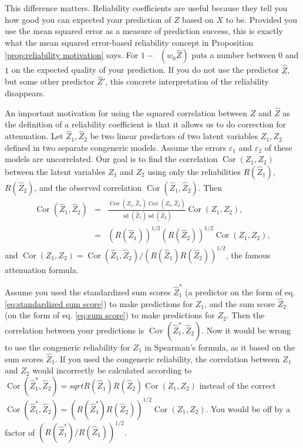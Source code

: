 \documentclass[twoside]{article}
\DeclareMathOperator{\sd}{sd}
\DeclareMathOperator{\Cor}{Cor}
\DeclareMathOperator{\Cov}{Cov}
\DeclareMathOperator{\MSE}{MSE_Z}
\renewcommand{\sqrt}[1]{{(#1)^{1/2}}}
\begin{document}
This difference matters. Reliability coefficients are useful because they tell you how good you can expected your prediction of $Z$ based on $X$ to be. Provided you use the mean squared error as a measure of prediction success, this is exactly what the mean squared error-based reliability concept in Proposition \ref{prop:reliability motivation} says. For $1 - \MSE(w_0\hat{Z})$ puts a number between $0$ and $1$ on the expected quality of your prediction. If you do not use the predictor $\hat{Z}$, but some other predictor $\hat{Z}'$, this concrete interpretation of the reliability disappears. 

An important motivation for using the squared
correlation between $Z$ and $\hat{Z}$ as the definition of a
reliability coefficient is that it allows us to do correction for
attenuation. Let $\hat{Z}_{1},\hat{Z}_{2}$ be two linear
predictors of two latent variables $Z_{1},Z_{2}$ defined in two separate
congeneric models. Assume the errors $\varepsilon_{1}$ and $\varepsilon_{2}$ of these models
are uncorrelated. Our goal is to find the correlation $\Cor(Z_{1},Z_{2})$
between the latent variables $Z_{1}$ and $Z_{2}$ using only the
reliabilities $ R(\hat{Z}_{1})$, $ R(\hat{Z}_{2})$,
and the observed correlation $\Cor(\hat{Z}_{1},\hat{Z}_{2})$.
Then
\begin{eqnarray*}
\Cor(\hat{Z}_{1},\hat{Z}_{2}) & = & \frac{\Cov(Z_{1},\hat{Z}_{1})\Cov(Z_{2},\hat{Z}_{2})}{\sd(\hat{Z}_{1})\sd(\hat{Z}_{2})}\Cor(Z_{1},Z_{2}),\\
 & = & \sqrt{ R(\hat{Z}_{1})}\sqrt{ R(\hat{Z}_{2})}\Cor(Z_{1},Z_{2}),
\end{eqnarray*}
and $\Cor(Z_{1},Z_{2})=\Cor(\hat{Z}_{1},\hat{Z}_{2})/\sqrt{ R(\hat{Z}_{1}) R(\hat{Z}_{2})}$,
the famous \citet{spearman1904proof} attenuation formula.


Assume you used the standardized sum scores $\hat{Z}_1^*$ (a predictor on the form of eq. \eqref{eq:standardized sum score}) to make predictions for $Z_1$, and the sum score $\hat{Z}_2$ (on the form of eq. \eqref{eq:sum score}) to make predictions for $Z_2$. Then the correlation between your predictions is $\Cov(\hat{Z}_1^*,\hat{Z}_2)$. Now it would be wrong to use the congeneric reliability for $Z_1$ in Spearman's formula, as it based on the sum scores $\hat{Z}_1$. If you used the congeneric reliability, the correlation between $Z_1$ and $Z_2$ would incorrectly be calculated according to $\Cor(\hat{Z}_{1}^*,\hat{Z}_{2})= sqrt{ R(\hat{Z}_{1}) R(\hat{Z}_{2})}\Cor(Z_{1},Z_{2})$
instead of the correct $\Cor(\hat{Z}_{1}^*,\hat{Z}_{2})=\sqrt{ R(\hat{Z}_{1}^{*}) R(\hat{Z}_{2})}\Cor(Z_{1},Z_{2})$.
You would be off by a factor of $\sqrt{ R(\hat{Z}_{1}^{*})/ R(\hat{Z}_{1})}$.
\end{document}

